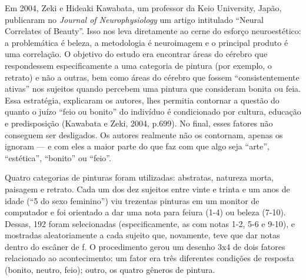Em 2004, Zeki e Hideaki Kawabata, um professor da Keio University,
Japão, publicaram no \emph{Journal of Neurophysiology} um artigo
intitulado ``Neural Correlates of Beauty''. Isso nos leva diretamente ao
cerne do esforço neuroestético: a problemática é beleza, a metodologia é
neuroimagem e o principal produto é uma correlação. O objetivo do estudo
era encontrar áreas do cérebro que respondessem especificamente a uma
categoria de pintura (por exemplo, o retrato) e não a outras, bem como
áreas do cérebro que fossem ``consistentemente ativas'' nos sujeitos
quando percebem uma pintura que consideram bonita ou feia. Essa
estratégia, explicaram os autores, lhes permitia contornar a questão do
quanto o juízo ``feio ou bonito'' do indivíduo é condicionado por
cultura, educação e predisposição (Kawabata e Zeki, 2004, p.699). No
final, esses fatores não conseguem ser desligados. Os autores realmente
não os contornam, apenas os ignoram --- e com eles a maior parte do que
faz com que algo seja ``arte'', ``estética'', ``bonito'' ou ``feio''.

Quatro categorias de pinturas foram utilizadas: abstratas, natureza
morta, paisagem e retrato. Cada um dos dez sujeitos entre vinte e trinta
e um anos de idade (``5 do sexo feminino'') viu trezentas pinturas em um
monitor de computador e foi orientado a dar uma nota para feiura (1-4)
ou beleza (7-10). Dessas, 192 foram selecionadas (especificamente, as
com notas 1-2, 5-6 e 9-10), e mostradas aleatoriamente a cada sujeito
que, novamente, teve que dar notas dentro do escâner de f. O
procedimento gerou um desenho 3x4 de dois fatores relacionado ao
acontecimento: um fator era três diferentes condições de resposta
(bonito, neutro, feio); outro, os quatro gêneros de pintura.

